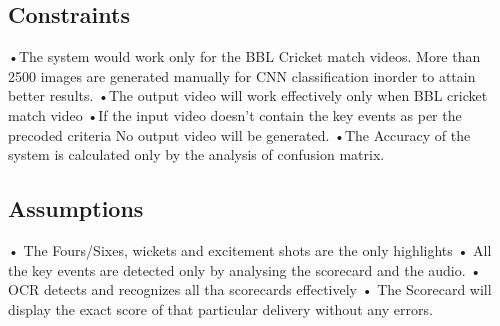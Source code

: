 \subsection{Constraints}
•The system would work only for the BBL Cricket match videos.
More than 2500 images are generated manually for CNN classification inorder to attain better results.
•The output video will work effectively only when BBL cricket match video 
•If the input video doesn't contain the key events as per the precoded criteria No output video will be generated.
•The Accuracy of the system is calculated only by the analysis of confusion matrix.

\subsection{Assumptions}
• The Fours/Sixes, wickets and excitement shots are the only highlights
• All the key events are detected only by analysing the scorecard and the audio.
• OCR detects and recognizes all tha scorecards effectively
• The Scorecard will display the exact score of that particular delivery without any errors.